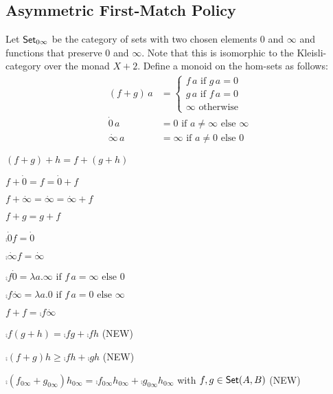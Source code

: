 \documentclass[runningheads,envcountsame]{llncs}
\begin{document}
\subsection{Asymmetric First-Match Policy}

Let $\mathsf{Set}_{0\infty}$ be the category of sets with two chosen elements $0$ and $\infty$ and functions that preserve $0$ and $\infty$. Note that this is isomorphic to the Kleisli-category over the monad $X+2$. Define a monoid on the hom-sets as follows:
\begin{align}
    (f + g)\,a &= \begin{cases}
        f\,a \mbox{ if } g\,a = 0 \\
        g\,a \mbox{ if } f\,a = 0 \\
        \infty \mbox{ otherwise}
        \end{cases} \\
    \dot0\,a &= 0 \mbox{ if } a \neq \infty \mbox{ else } \infty \\
    \dot\infty\,a &= \infty \mbox{ if } a \neq 0 \mbox{ else } 0
\end{align}

\begin{lemma}
    \begin{lemmalist}
        \item $(f + g) + h = f + (g + h)$
        \item $f + \dot0 = f = \dot0 + f$
        \item $f + \dot\infty = \dot\infty = \dot\infty + f$
        \item $f + g = g + f$
        \item $\comp{\dot0}{f} = \dot0$
        \item $\comp{\dot\infty}{f} = \dot\infty$
        \item $\comp{f}{\dot0} = \lambda a. \infty \mbox{ if } f\,a = \infty \mbox{ else } 0$
        \item $\comp{f}{\dot\infty} = \lambda a. 0 \mbox{ if } f\,a = 0 \mbox{ else } \infty$
        \item $f + f = \comp{f}{\dot\infty}$
        \item $\comp{f}{(g + h)} = \comp{f}{g} + \comp{f}{h}$ (NEW)
        \item $\comp{(f + g)}{h} \geq \comp{f}{h} + \comp{g}{h}$ (NEW)
        \item $\comp{(f_{0\infty} + g_{0\infty})}{h_{0\infty}} = \comp{f_{0\infty}}{h_{0\infty}} + \comp{g_{0\infty}}{h_{0\infty}}$ with $f, g \in \mathsf{Set}(A, B)$ (NEW)
    \end{lemmalist}
\end{lemma}
\end{document}
